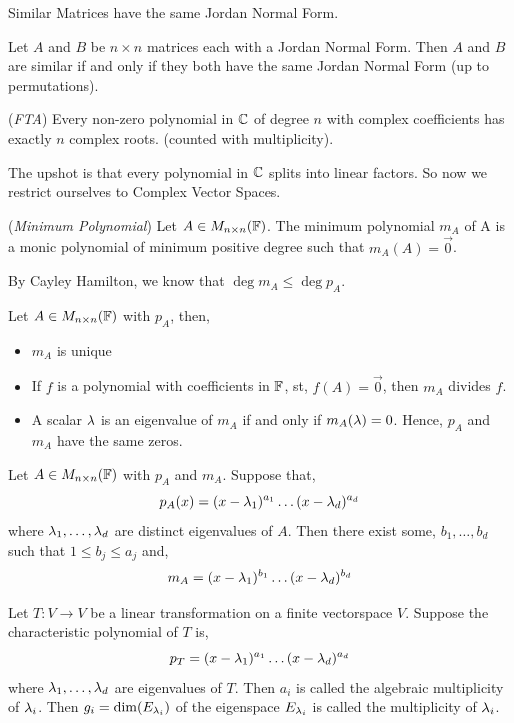 \documentclass{article}
\begin{document}
Similar Matrices have the same Jordan Normal Form.

\begin{ncor}
  Let $A$ and $B$ be $n \times n$ matrices each with a Jordan Normal Form. Then $A$ and $B$ are similar if and only if they both have the same Jordan Normal Form (up to permutations).
\end{ncor}

\begin{nthm}{(\textit{FTA})}
  Every non-zero polynomial in $\mathbb{C}$ of degree $n$ with complex coefficients has exactly $n$ complex roots. (counted with multiplicity).
\end{nthm}

The upshot is that every polynomial in $\mathbb{C}$ splits into linear factors. So now we restrict ourselves to Complex Vector Spaces.

\begin{ndefi}{(\textit{Minimum Polynomial})}
  Let $A \in M_{n\times n}(\mathbb{F})$. The minimum polynomial $m_A$ of A is a monic polynomial of minimum positive degree such that $m_A(A) = \vec 0$.
\end{ndefi}
By Cayley Hamilton, we know that $\deg m_A \le \deg p_A$.

\begin{nlemma}
  Let $A \in M_{n\times n} (\mathbb{F})$ with $p_A$, then,
  \begin{itemize}
    \item $m_A$ is unique
    \item If $f$ is a polynomial with coefficients in $\mathbb{F}$, st, $f(A) = \vec 0$, then $m_A$ divides $f$.
    \item A scalar $\lambda$ is an eigenvalue of $m_A$ if and only if $m_A(\lambda) = 0$. Hence, $p_A$ and $m_A$ have the same zeros.
  \end{itemize}
\end{nlemma}

\begin{ncor}
  Let $A \in M_{n\times n} (\mathbb{F})$ with $p_A$ and $m_A$. Suppose that,
  $$ p_A(x) = (x - \lambda_1)^{a_1}\ldots(x - \lambda_d)^{a_d} $$
  where $\lambda_1,\ldots, \lambda_d$ are distinct eigenvalues of $A$. Then there exist some, $b_1, \dots, b_d$ such that $1 \le b_j \le a_j$ and,
  $$ m_A = (x - \lambda_1)^{b_1} \ldots (x - \lambda_d)^{b_d} $$
\end{ncor}

\begin{ndefi}
  Let $T : V \to V$ be a linear transformation on a finite vectorspace $V$. Suppose the characteristic polynomial of $T$ is,
  $$ p_T = (x - \lambda_1)^{a_1}\ldots(x - \lambda_d)^{a_d} $$
  where $\lambda_1, \ldots, \lambda_d$ are eigenvalues of $T$. Then $a_i$ is called the algebraic multiplicity of $\lambda_i$. Then $g_i = \dim(E_{\lambda_i})$ of the eigenspace $E_{\lambda_i}$ is called the multiplicity of $\lambda_i$.
\end{ndefi}
\end{document}
